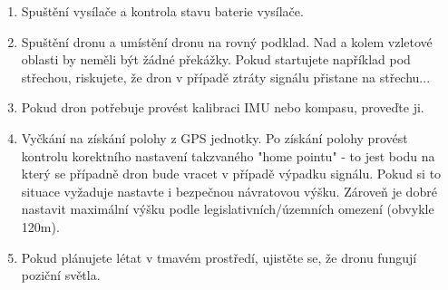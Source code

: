 \begin{enumerate}
    \item Spuštění vysílače a kontrola stavu baterie vysílače.
    \item Spuštění dronu a umístění dronu na rovný podklad. Nad a kolem vzletové oblasti by neměli být žádné překážky. Pokud startujete například pod střechou, riskujete, že dron v případě ztráty signálu přistane na střechu...
    \item Pokud dron potřebuje provést kalibraci IMU nebo kompasu, proveďte ji.
    \item Vyčkání na získání polohy z GPS jednotky. Po získání polohy provést kontrolu korektního nastavení takzvaného "home pointu" - to jest bodu na který se případně dron bude vracet v případě výpadku signálu. Pokud si to situace vyžaduje nastavte i bezpečnou návratovou výšku. Zároveň je dobré nastavit maximální výšku podle legislativních/územních omezení (obvykle 120m).
    \item Pokud plánujete létat v tmavém prostředí, ujistěte se, že dronu fungují poziční světla. 
    
\end{enumerate}

